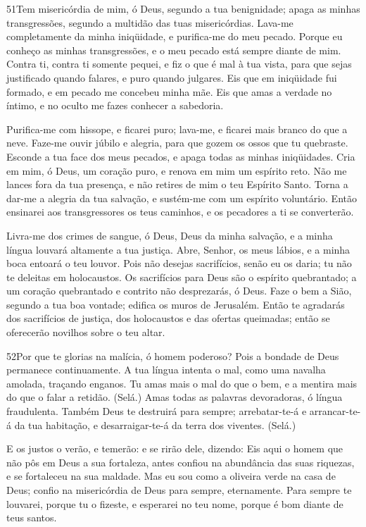 \bigskip

\lettrine{51}{}Tem misericórdia de mim, ó Deus, segundo a tua
benignidade; apaga as minhas transgressões, segundo a multidão das
tuas misericórdias. Lava-me completamente da minha iniqüidade, e
purifica-me do meu pecado. Porque eu conheço as minhas
transgressões, e o meu pecado está sempre diante de mim. Contra
ti, contra ti somente pequei, e fiz o que é mal à tua vista, para
que sejas justificado quando falares, e puro quando julgares.
Eis que em iniqüidade fui formado, e em pecado me concebeu minha
mãe. Eis que amas a verdade no íntimo, e no oculto me fazes
conhecer a sabedoria.

Purifica-me com hissope, e ficarei puro; lava-me, e ficarei mais
branco do que a neve. Faze-me ouvir júbilo e alegria, para que
gozem os ossos que tu quebraste. Esconde a tua face dos meus
pecados, e apaga todas as minhas iniqüidades. Cria em mim, ó
Deus, um coração puro, e renova em mim um espírito reto. Não
me lances fora da tua presença, e não retires de mim o teu Espírito
Santo. Torna a dar-me a alegria da tua salvação, e sustém-me
com um espírito voluntário. Então ensinarei aos
transgressores os teus caminhos, e os pecadores a ti se converterão.

Livra-me dos crimes de sangue, ó Deus, Deus da minha salvação, e
a minha língua louvará altamente a tua justiça. Abre, Senhor,
os meus lábios, e a minha boca entoará o teu louvor. Pois não
desejas sacrifícios, senão eu os daria; tu não te deleitas em
holocaustos. Os sacrifícios para Deus são o espírito
quebrantado; a um coração quebrantado e contrito não desprezarás, ó
Deus. Faze o bem a Sião, segundo a tua boa vontade; edifica
os muros de Jerusalém. Então te agradarás dos sacrifícios de
justiça, dos holocaustos e das ofertas queimadas; então se
oferecerão novilhos sobre o teu altar.

\bigskip

\lettrine{52}{}Por que te glorias na malícia, ó homem poderoso?
Pois a bondade de Deus permanece continuamente. A tua língua
intenta o mal, como uma navalha amolada, traçando enganos. Tu
amas mais o mal do que o bem, e a mentira mais do que o falar a
retidão. (Selá.) Amas todas as palavras devoradoras, ó língua
fraudulenta. Também Deus te destruirá para sempre;
arrebatar-te-á e arrancar-te-á da tua habitação, e desarraigar-te-á
da terra dos viventes. (Selá.)

E os justos o verão, e temerão: e se rirão dele, dizendo: Eis
aqui o homem que não pôs em Deus a sua fortaleza, antes confiou na
abundância das suas riquezas, e se fortaleceu na sua maldade.
Mas eu sou como a oliveira verde na casa de Deus; confio na
misericórdia de Deus para sempre, eternamente. Para sempre te
louvarei, porque tu o fizeste, e esperarei no teu nome, porque é bom
diante de teus santos.

